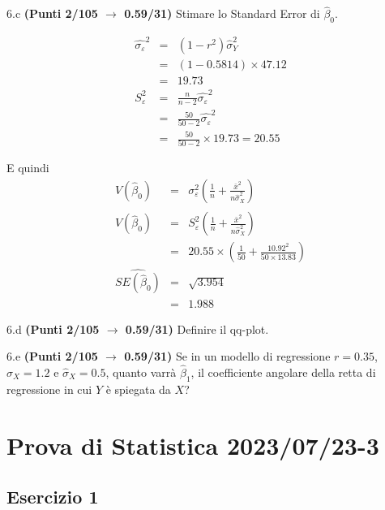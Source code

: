 \documentclass[
  11pt,
]{book}
\theoremstyle{mytheoremstyle}
\theoremstyle{mydefstyle}
\newenvironment{sol}
  {
  \begin{tcolorbox}[enhanced,breakable,arc=0.1mm,boxrule=1pt,colback=white,colframe=iblue,
  title=\bf \fontfamily{lmss}\selectfont \hspace{.5 cm} Soluzione,drop fuzzy shadow]

}{
\end{tcolorbox}
  }
\begin{document}
6.c \textbf{(Punti 2/105 \(\rightarrow\) 0.59/31)} Stimare lo Standard Error di \(\hat\beta_0\).

\begin{sol}
\begin{eqnarray*}
\hat{\sigma_\varepsilon}^2&=&(1-r^2)\hat\sigma_Y^2\\
&=& (1- 0.5814 )\times 47.12 \\
   &=&  19.73 \\
   S_\varepsilon^2 &=& \frac{n} {n-2} \hat{\sigma_\varepsilon}^2\\
   &=&  \frac{ 50 } { 50 -2} \hat{\sigma_\varepsilon}^2 \\
 &=&  \frac{ 50 } { 50 -2} \times  19.73  =  20.55  
\end{eqnarray*}

E quindi\begin{eqnarray*}
V(\hat\beta_{0}) &=& \sigma_{\varepsilon}^{2} \left( \frac{1} {n}  +  \frac{\bar{x}^{2}} {n \hat{\sigma}^{2}_{X}} \right)\\
\widehat{V(\hat\beta_{0})} &=& S_{\varepsilon}^{2}\left( \frac{1} {n}  +  \frac{\bar{x}^{2}} {n \hat{\sigma}^{2}_{X}} \right)\ \\
 &=&  20.55 \times\left( \frac{1} { 50 }  +  \frac{ 10.92 ^{2}} { 50 \times  13.83 } \right)\\
 \widehat{SE(\hat\beta_{0})}        &=&  \sqrt{ 3.954 }\\
 &=&  1.988 
\end{eqnarray*}

\end{sol}

6.d \textbf{(Punti 2/105 \(\rightarrow\) 0.59/31)} Definire il qq-plot.

6.e \textbf{(Punti 2/105 \(\rightarrow\) 0.59/31)} Se in un modello di regressione \(r=0.35\), \(\hat\sigma_X=1.2\) e \(\hat\sigma_X=0.5\), quanto varrà
\(\hat\beta_1\), il coefficiente angolare della retta di regressione in cui \(Y\) è spiegata da \(X\)?

\section{Prova di Statistica 2023/07/23-3}\label{prova-di-statistica-20230723-3}

\subsection{Esercizio 1}\label{esercizio-1-34}
\end{document}
